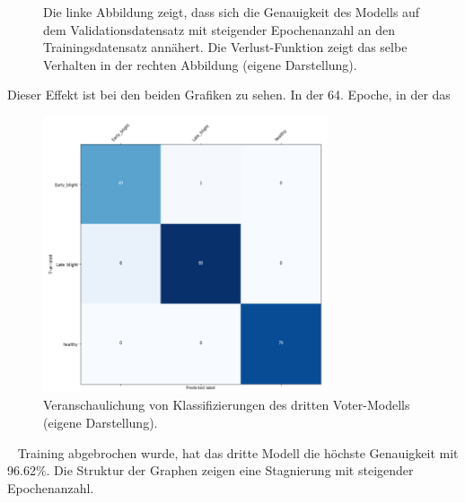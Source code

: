 \begin{figure}[h!]
	
	\hfill
	\hfill
	\hfill
	\caption{Die linke Abbildung zeigt, dass sich die Genauigkeit des Modells auf dem Validationsdatensatz mit steigender Epochenanzahl an den Trainingsdatensatz annähert. Die Verlust-Funktion zeigt das selbe Verhalten in der rechten Abbildung (eigene Darstellung).
	}
	\label{eval_acc_loss_voter3}
\end{figure}

Dieser Effekt ist bei den beiden Grafiken zu sehen. In der 64. Epoche, in der das

\begin{figure}[h!]
	\centering
	\includegraphics[width=0.75\textwidth]{model/voter3/voter3_cm.PNG}
	\caption{Veranschaulichung von Klassifizierungen des dritten Voter-Modells (eigene Darstellung).}
	\label{voter3_cm}
\end{figure}
~\newline
Training abgebrochen wurde, hat das dritte Modell die höchste Genauigkeit mit 96.62\%. Die Struktur der Graphen zeigen eine Stagnierung mit steigender Epochenanzahl.



